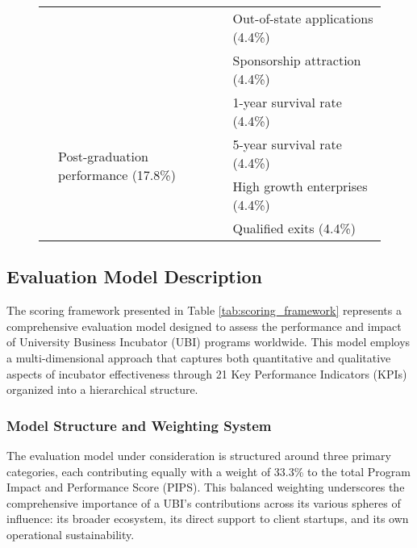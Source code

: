 \documentclass[../Main.tex]{subfiles}
\begin{document}
\begin{figure}[H]
\begin{tabular}{|p{}|p{}|p{}|}
\cline{3-3}
& & Out-of-state applications (4.4\%) \\
\cline{3-3}
& & Sponsorship attraction (4.4\%) \\
\cline{2-3}
& \multirow{4}{=}{Post-graduation performance (17.8\%)} & 1-year survival rate (4.4\%) \\
\cline{3-3}
& & 5-year survival rate (4.4\%) \\
\cline{3-3}
& & High growth enterprises (4.4\%) \\
\cline{3-3}
& & Qualified exits (4.4\%) \\
\hline
\end{tabular}
\end{figure}

\subsection{Evaluation Model Description}

The scoring framework presented in Table \ref{tab:scoring_framework} represents a comprehensive evaluation model designed to assess the performance and impact of University Business Incubator (UBI) programs worldwide. This model employs a multi-dimensional approach that captures both quantitative and qualitative aspects of incubator effectiveness through 21 Key Performance Indicators (KPIs) organized into a hierarchical structure.

\subsubsection{Model Structure and Weighting System}

The evaluation model under consideration is structured around three primary categories, each contributing equally with a weight of 33.3\% to the total Program Impact and Performance Score (PIPS). This balanced weighting underscores the comprehensive importance of a UBI's contributions across its various spheres of influence: its broader ecosystem, its direct support to client startups, and its own operational sustainability.
\end{document}
